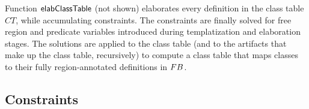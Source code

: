
Function ${\sf elabClassTable}$ (not shown) elaborates
every definition in the class table $CT$, while accumulating
constraints. The constraints are finally solved for free region and
predicate variables introduced during templatization and elaboration
stages. The solutions are applied to the class table (and to the
artifacts that make up the class table, recursively) to compute a
class table that maps classes to their fully region-annotated
definitions in ${\sc FB}$.


\subsection{Constraints}
\label{sec:constraints}

